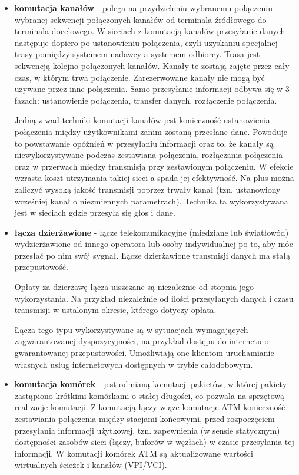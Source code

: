 \begin{itemize}
	\setlength\itemsep{1pt}
	\item \textbf{komutacja kanałów} - polega na przydzieleniu wybranemu połączeniu wybranej sekwencji połączonych kanałów od terminala źródłowego do terminala docelowego. W sieciach z komutacją kanałów przesyłanie danych następuje dopiero po ustanowieniu połączenia, czyli uzyskaniu specjalnej trasy pomiędzy systemem nadawcy a systemem odbiorcy. Trasa jest sekwencją kolejno połączonych kanałów. Kanały te zostają zajęte przez cały czas, w którym trwa połączenie. Zarezerwowane kanały nie mogą być używane przez inne połączenia. Samo przesyłanie informacji odbywa się w 3 fazach: ustanowienie połączenia, transfer danych, rozłączenie połączenia.
	
	Jedną z wad techniki komutacji kanałów jest konieczność ustanowienia połączenia między użytkownikami zanim zostaną przesłane dane. Powoduje to powstawanie opóźnień w przesyłaniu informacji oraz to, że kanały są niewykorzystywane podczas zestawiana połączenia, rozłączania połączenia oraz w przerwach między transmisją przy zestawionym połączeniu. W efekcie wzrasta koszt utrzymania takiej sieci a spada jej efektywność. Na plus można zaliczyć wysoką jakość transmisji poprzez trwały kanał (tzn. ustanowiony wcześniej kanał o niezmiennych parametrach). Technika ta wykorzystywana jest w sieciach gdzie przesyła się głos i dane.
	
	\item \textbf{łącza dzierżawione} - łącze telekomunikacyjne (miedziane lub światłowód) wydzierżawione od innego operatora lub osoby indywidualnej po to, aby móc przesłać po nim swój sygnał. Łącze dzierżawione transmisji danych ma stałą przepustowość.
	
	Opłaty za dzierżawę łącza uiszczane są niezależnie od stopnia jego wykorzystania. Na przykład niezależnie od ilości przesyłanych danych i czasu transmisji w ustalonym okresie, którego dotyczy opłata.
	
	Łącza tego typu wykorzystywane są w sytuacjach wymagających zagwarantowanej dyspozycyjności, na przykład dostępu do internetu o gwarantowanej przepustowości. Umożliwiają one klientom uruchamianie własnych usług internetowych dostępnych w trybie całodobowym.
	
	\item \textbf{komutacja komórek} - jest odmianą komutacji pakietów, w której pakiety zastąpiono krótkimi komórkami o stałej długości, co pozwala na sprzętową realizacje komutacji. Z komutacją łączy wiąże komutacje ATM konieczność zestawiania połączenia między stacjami końcowymi, przed rozpoczęciem przesyłania informacji użytkowej, tzn. zapewnienia (w sensie statycznym) dostępności zasobów sieci (łączy, buforów w węzłach) w czasie przesyłania tej informacji. W komutacji komórek ATM są aktualizowane wartości wirtualnych ścieżek i kanałów (VPI/VCI).
	

\end{itemize}
